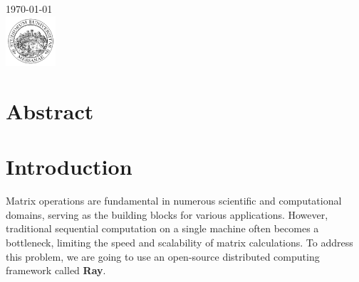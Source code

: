 \begin{titlepage}


{\large \today}\\[2cm] %


\includegraphics[width=70px, keepaspectratio]{unime.png}\\[1cm] %
 

\vfill %

\end{titlepage}

\tableofcontents
\pagebreak

\section{Abstract}

\section{Introduction}
Matrix operations are fundamental in numerous scientific and computational domains, serving as the building blocks for various applications. However, traditional sequential computation on a single machine often becomes a bottleneck, limiting the speed and scalability of matrix calculations. To address this problem, we are going to use an open-source distributed computing framework called \textbf{Ray}.

